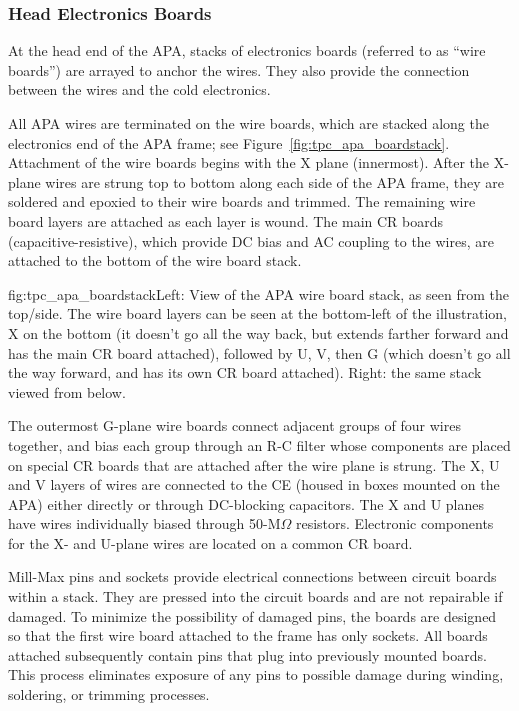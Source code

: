 \subsubsection{Head Electronics Boards}

At the head end of the APA, stacks of electronics boards (referred to as ``wire boards'') are arrayed to anchor the wires.  They also provide the connection between the wires and the cold electronics.

All APA wires are terminated on the wire boards, which are stacked along the electronics end of the APA frame; see Figure~\ref{fig:tpc_apa_boardstack}. 
Attachment of the wire boards begins with the X plane (innermost). After the X-plane wires are strung top to bottom along each side of the APA frame, they are soldered and epoxied to their wire boards and trimmed. The remaining wire board layers are attached as each layer is wound.  The main CR boards (capacitive-resistive), which provide DC bias and AC coupling to the wires, are attached to the bottom of the wire board stack. 

\begin{dunefigure}{fig:tpc_apa_boardstack}{Left: View of the APA wire board stack, as seen from the top/side. The wire board layers can be seen at the bottom-left of the illustration, X on the bottom (it doesn't go all the way back, but extends farther forward and has the main CR board attached), followed by U, V, then G (which doesn't go all the way forward, and has its own CR board attached). Right: the same stack viewed from below. }
\end{dunefigure}

The outermost G-plane wire boards connect adjacent groups of four wires together, and bias each group through an R-C filter whose components are placed on special CR boards   
that are attached after the wire plane is strung. The X, U and V layers of wires are connected to the CE (housed in boxes mounted on the APA) either directly or through DC-blocking capacitors. The X and U planes have wires individually biased through 50-M$\Omega$ resistors. Electronic components for the X- and U-plane wires are located on a common CR board. 

Mill-Max pins and sockets provide electrical connections between circuit boards within a stack. They are pressed into the circuit boards and are not repairable if damaged. To minimize the possibility of damaged pins, the boards are designed so that the first wire board attached to the frame has only sockets. All boards attached subsequently contain pins that plug into previously mounted boards. This process eliminates exposure of any pins to possible damage during winding, soldering, or trimming processes.

